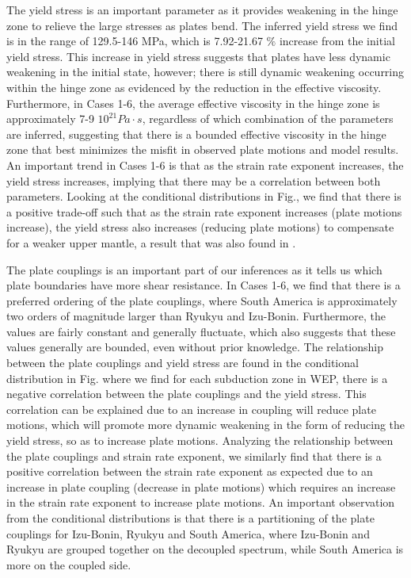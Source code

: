 \documentclass[12pt]{article}
\begin{document}
{The yield stress is an important parameter as it provides weakening in the hinge zone to relieve the large stresses as plates bend. The inferred yield stress we find is in the range of 129.5-146 MPa, which is 7.92-21.67 $\%$ increase from the initial yield stress. This increase in yield stress suggests that plates have less dynamic weakening in the initial state, however; there is still dynamic weakening occurring within the hinge zone as evidenced by the reduction in the effective viscosity. Furthermore, in Cases 1-6, the average effective viscosity in the hinge zone is approximately 7-9 $10^{21} Pa\cdot s$, regardless of which combination of the parameters are inferred, suggesting that there is a bounded effective viscosity in the hinge zone that best minimizes the misfit in observed plate motions and model results. An important trend in Cases 1-6 is that as the strain rate exponent increases, the yield stress increases, implying that there may be a correlation between both parameters. Looking at the conditional distributions in Fig., we find that there is a positive trade-off such that as the strain rate exponent increases (plate motions increase), the yield stress also increases (reducing plate motions) to compensate for a weaker upper mantle, a result that was also found in \citep{ratnaswamy2015adjoint}.

The plate couplings is an important part of our inferences as it tells us which plate boundaries have more shear resistance. In Cases 1-6, we find that there is a preferred ordering of the plate couplings, where South America is approximately two orders of magnitude larger than Ryukyu and Izu-Bonin. Furthermore, the values are fairly constant and generally fluctuate, which also suggests that these values generally are bounded, even without prior knowledge. The relationship between the plate couplings and yield stress are found in the conditional distribution in Fig. where we find for each subduction zone in WEP, there is a negative correlation between the plate couplings and the yield stress. This correlation can be explained due to an increase in coupling will reduce plate motions, which will promote more dynamic weakening in the form of reducing the yield stress, so as to increase plate motions. Analyzing the relationship between the plate couplings and strain rate exponent, we similarly find that there is a positive correlation between the strain rate exponent as expected due to an increase in plate coupling (decrease in plate motions) which requires an increase in the strain rate exponent to increase plate motions.  An important observation from the conditional distributions is that there is a partitioning of the plate couplings for Izu-Bonin, Ryukyu and South America, where Izu-Bonin and Ryukyu are grouped together on the decoupled spectrum, while South America is more on the coupled side.  

}
\end{document}

